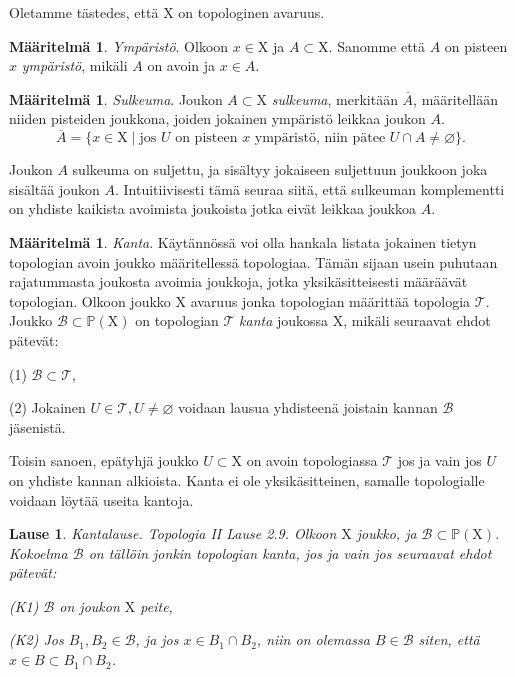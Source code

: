 \documentclass[12pt,a4paper,leqno]{report}
\newcommand{\X}{\mathrm{X}}
\newcommand{\Pow}{\mathbb{P}}
\newcommand{\B}{\mathcal{B}}
\newcommand{\T}{\mathcal{T}}
\theoremstyle{plain}
\newtheorem{lause}[equation]{Lause}
\theoremstyle{definition}
\newtheorem{maar}[equation]{Määritelmä}
\theoremstyle{remark}
\begin{document}
Oletamme tästedes, että $\X$ on topologinen avaruus.

\begin{maar}\label{ymp}
\emph{Ympäristö}. Olkoon $x \in \X$ ja $A \subset \X$. Sanomme että $A$ on pisteen $x$ \emph{ympäristö}, mikäli $A$ on avoin ja $x \in A$.
\end{maar}

\begin{maar}\label{sulk}
\emph{Sulkeuma}. Joukon $A \subset \X$ \emph{sulkeuma}, merkitään $\overline{A}$, määritellään niiden pisteiden joukkona, joiden jokainen ympäristö leikkaa joukon $A$.
\begin{equation}
\overline{A} = \{ x \in \X \mid \text{jos } U \text{ on pisteen } x \text{ ympäristö, niin pätee } U \cap A \not= \varnothing \}\text{.}
\end{equation}
\end{maar}

Joukon $A$ sulkeuma on suljettu, ja sisältyy jokaiseen suljettuun joukkoon joka sisältää joukon $A$. Intuitiivisesti tämä seuraa siitä, että sulkeuman komplementti on yhdiste kaikista avoimista joukoista jotka eivät leikkaa joukkoa $A$.

\begin{maar}\label{kantamaar}
\emph{Kanta}. Käytännössä voi olla hankala listata jokainen tietyn topologian avoin joukko määritellessä topologiaa. Tämän sijaan usein puhutaan rajatummasta joukosta avoimia joukkoja, jotka yksikäsitteisesti määräävät topologian. Olkoon joukko $\X$ avaruus jonka topologian määrittää topologia $\T$. Joukko $\B \subset \Pow(\X)$ on topologian $\T$ \emph{kanta} joukossa $\X$, mikäli seuraavat ehdot pätevät:

(1) $\B \subset \T$,

(2) Jokainen $U \in \T, U \not= \varnothing$ voidaan lausua yhdisteenä joistain kannan $\B$ jäsenistä.
\end{maar}

Toisin sanoen, epätyhjä joukko $U \subset \X$ on avoin topologiassa $\T$ jos ja vain jos $U$ on yhdiste kannan alkioista. Kanta ei ole yksikäsitteinen, samalle topologialle voidaan löytää useita kantoja.

\begin{lause}\label{kantalause}
\emph{Kantalause. Topologia II \cite{Topo} Lause 2.9}. Olkoon $\X$ joukko, ja $\B \subset \Pow(\X)$. Kokoelma $\B$ on tällöin jonkin topologian kanta, jos ja vain jos seuraavat ehdot pätevät:

(K1) $\B$ on joukon $\X$ peite,

(K2) Jos $B_1, B_2 \in \B$, ja jos $x \in B_1 \cap B_2$, niin on olemassa $B \in \B$ siten, että $x \in B \subset B_1 \cap B_2$.
\end{lause}
\end{document}
